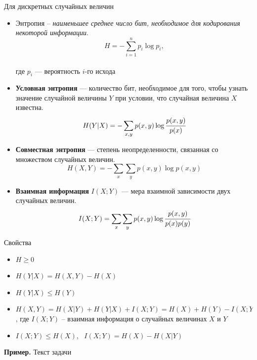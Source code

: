 \documentclass[final]{beamer}
\newlength{\onecolwid}
\begin{document}
\begin{frame}[t]
\begin{columns}[t]
\begin{column}{\onecolwid}
\begin{block}{Для дискретных случайных величин}
\begin{itemize}
    \item Энтропия -- \textit{наименьшее среднее число бит, необходимое для кодирования некоторой информации}.\\[-1.6cm]
    \[H=-\sum\limits_{i=1}^n p_i\log p_i, \]\\[-0.5cm]
    где $p_i$ --- вероятность $i$-го исхода    
    \item \textbf{Условная энтропия} --- количество бит, необходимое для того, чтобы узнать значение случайной величины $Y$ при условии, что случайная величина $X$ известна.\\[-1.6cm]
    \[H(Y|X)=-\sum\limits_{x, y} p(x, y)\log \cfrac{p(x, y)}{p(x)} \]
    \item \textbf{Совместная энтропия} --- степень неопределенности, связанная со множеством случайных величин.\\[-1.4cm]
    \[H(X, Y)=-\sum\limits_{x}\sum\limits_{y} p(x, y)\log p(x ,y) \]
    \item \textbf{Взаимная информация} $I(X; Y)$ --- мера взаимной зависимости двух случайных величин.\\[-1.5cm]
    \[I(X; Y) = \sum\limits_{x}\sum\limits_{y} p(x, y)\log \cfrac{p(x, y)}{p(x)p(y)} \]
\end{itemize}

\begin{alertblock}{Свойства}
	\begin{itemize}
		\item $H \geqslant 0$
		\item $H(Y|X)=H(X, Y)-H(X)$ 
		\item $H(Y|X)\leqslant H(Y)$
		\item $H(X, Y)=H(X|Y)+H(Y|X)+I(X; Y)=H(X)+H(Y)-I(X; Y)$, где $I(X; Y)$ -- взаимная информация о случайных величинах $X$ и $Y$
		\item $I(X; Y)\leqslant H(X)$, \ $I(X; Y)=H(X)-H(X|Y)$
	\end{itemize}
\end{alertblock}

\textbf{Пример.} Текст задачи
\end{block}





\end{column}
\end{columns}
\end{frame}
\end{document}
